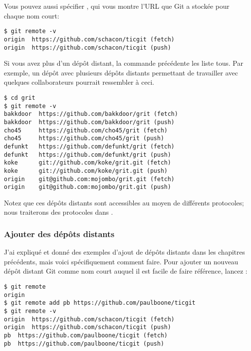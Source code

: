 Vous pouvez aussi spécifier , qui vous montre l'URL que Git a stockée pour chaque nom court:
\begin{Schunk}
\begin{Verbatim}
$ git remote -v
origin	https://github.com/schacon/ticgit (fetch)
origin	https://github.com/schacon/ticgit (push)
\end{Verbatim}
\end{Schunk}

Si vous avez plus d'un dépôt distant, la commande précédente les liste tous.
Par exemple, un dépôt avec plusieurs dépôts distants permettant de travailler avec quelques collaborateurs pourrait ressembler à ceci.
\begin{Schunk}
\begin{Verbatim}
$ cd grit
$ git remote -v
bakkdoor  https://github.com/bakkdoor/grit (fetch)
bakkdoor  https://github.com/bakkdoor/grit (push)
cho45     https://github.com/cho45/grit (fetch)
cho45     https://github.com/cho45/grit (push)
defunkt   https://github.com/defunkt/grit (fetch)
defunkt   https://github.com/defunkt/grit (push)
koke      git://github.com/koke/grit.git (fetch)
koke      git://github.com/koke/grit.git (push)
origin    git@github.com:mojombo/grit.git (fetch)
origin    git@github.com:mojombo/grit.git (push)
\end{Verbatim}
\end{Schunk}

Notez que ces dépôts distants sont accessibles au moyen de différents protocoles; nous traiterons des protocoles dans .

\subsubsection{Ajouter des dépôts distants}

J'ai expliqué et donné des exemples d'ajout de dépôts distants dans les chapitres précédents, mais voici spécifiquement comment faire.
Pour ajouter un nouveau dépôt distant Git comme nom court auquel il est facile de faire référence, lancez :
\begin{Schunk}
\begin{Verbatim}
$ git remote
origin
$ git remote add pb https://github.com/paulboone/ticgit
$ git remote -v
origin	https://github.com/schacon/ticgit (fetch)
origin	https://github.com/schacon/ticgit (push)
pb	https://github.com/paulboone/ticgit (fetch)
pb	https://github.com/paulboone/ticgit (push)
\end{Verbatim}
\end{Schunk}

